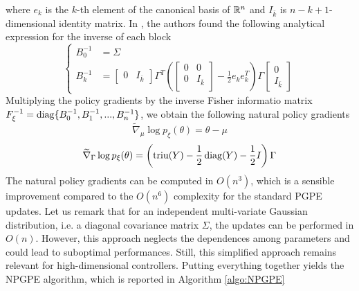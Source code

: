 where $e_k$ is the $k$-th element of the canonical basis of $\mathbb{R}^n$ and $I_{\bar{k}}$ is $n - k + 1$-dimensional identity matrix. In \cite{akimoto2010bidirectional}, the authors found the following analytical expression for the inverse of each block
\begin{equation*}
	\begin{cases}
		B_0^{-1} &= \Sigma\\	
		B_k^{-1} &= \begin{bmatrix}
				0 & I_{\bar{k}}
		\end{bmatrix} \Gamma^T \left(\begin{bmatrix}
			0 & 0 \\
			0 & I_{\bar{k}}\\
		\end{bmatrix}   -\frac{1}{2} e_k e_k^T\right) \Gamma \begin{bmatrix}
						0 \\ I_{\bar{k}}
				\end{bmatrix}
	\end{cases}
\end{equation*}
Multiplying the policy gradients by the inverse Fisher informatio matrix $F_\xi^{-1} = \operatorname{diag}\{B_0^{-1}, B_1^{-1}, ..., B_n^{-1}\}$, we obtain the following natural policy gradients
\begin{equation}
	\widetilde{\nabla}_\mu \log p_\xi(\theta) = \theta - \mu
\end{equation}
\begin{equation}
	\widetilde{\nabla}_\Gamma \log p_\xi(\theta) = \left(\operatorname{triu}(Y) - \frac{1}{2} \operatorname{diag}(Y) - \frac{1}{2} I \right) \Gamma
\end{equation}
The natural policy gradients can be computed in $O(n^3)$, which is a sensible improvement compared to the $O(n^6)$ complexity for the standard PGPE updates. Let us remark that for an independent multi-variate Gaussian distribution, i.e. a diagonal covariance matrix $\Sigma$, the updates can be performed in $O(n)$. However, this approach neglects the dependences among parameters and could lead to suboptimal performances. Still, this simplified approach remains relevant for high-dimensional controllers. Putting everything together yields the NPGPE algorithm, which is reported in Algorithm \ref{algo:NPGPE}
